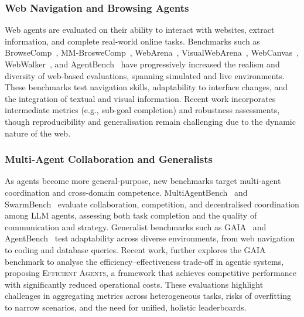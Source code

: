 \subsubsection{Web Navigation and Browsing Agents}
Web agents are evaluated on their ability to interact with websites, extract information, and complete real-world online tasks. Benchmarks such as BrowseComp~\citep{wei2025browsecomp}, MM-BrosweComp~\citep{li2025mm}, WebArena~\citep{zhou2023webarena}, VisualWebArena~\citep{koh2024visualwebarena}, WebCanvas~\citep{pan2024webcanvas}, WebWalker~\citep{wu2025webwalker}, and AgentBench~\citep{liu2023agentbench} have progressively increased the realism and diversity of web-based evaluations, spanning simulated and live environments. These benchmarks test navigation skills, adaptability to interface changes, and the integration of textual and visual information. Recent work incorporates intermediate metrics (e.g., sub-goal completion) and robustness assessments, though reproducibility and generalisation remain challenging due to the dynamic nature of the web.

\subsubsection{Multi-Agent Collaboration and Generalists}
As agents become more general-purpose, new benchmarks target multi-agent coordination and cross-domain competence. MultiAgentBench~\citep{zhu2025multiagentbench} and SwarmBench~\citep{ruan2025benchmarking} evaluate collaboration, competition, and decentralised coordination among LLM agents, assessing both task completion and the quality of communication and strategy. Generalist benchmarks such as GAIA~\citep{mialon2023gaia} and AgentBench~\citep{liu2023agentbench} test adaptability across diverse environments, from web navigation to coding and database queries. Recent work, \cite{wang2025efficientagentsbuildingeffective} further explores the GAIA benchmark to analyse the efficiency–effectiveness trade-off in agentic systems, proposing \textsc{Efficient Agents}, a framework that achieves competitive performance with significantly reduced operational costs. These evaluations highlight challenges in aggregating metrics across heterogeneous tasks, risks of overfitting to narrow scenarios, and the need for unified, holistic leaderboards.

